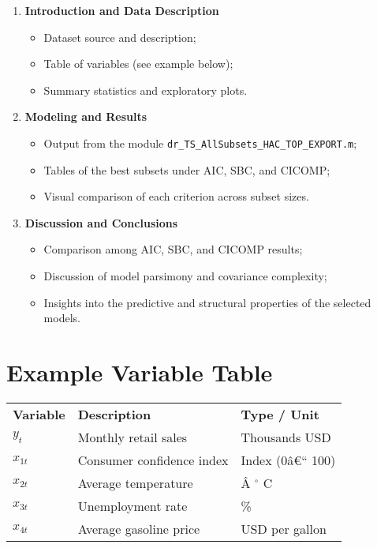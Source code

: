 \documentclass[12pt,thmsa]{article}
\begin{document}
\begin{enumerate}
\item \textbf{Introduction and Data Description}

\begin{itemize}
\item Dataset source and description;

\item Table of variables (see example below);

\item Summary statistics and exploratory plots.
\end{itemize}

\item \textbf{Modeling and Results}

\begin{itemize}
\item Output from the module \texttt{dr\_TS\_AllSubsets\_HAC\_TOP\_EXPORT.m};

\item Tables of the best subsets under AIC, SBC, and CICOMP;

\item Visual comparison of each criterion across subset sizes.
\end{itemize}

\item \textbf{Discussion and Conclusions}

\begin{itemize}
\item Comparison among AIC, SBC, and CICOMP results;

\item Discussion of model parsimony and covariance complexity;

\item Insights into the predictive and structural properties of the selected
models.
\end{itemize}
\end{enumerate}

\section*{Example Variable Table}

\vspace{1pt}

\begin{tabular}{lll}
\textbf{Variable} & \textbf{Description} & \textbf{Type / Unit} \\ 
$y_{t}$ & Monthly retail sales & Thousands USD \\ 
$x_{1t}$ & Consumer confidence index & Index (0\^{a}\euro \textquotedblleft
100) \\ 
$x_{2t}$ & Average temperature & \^{A}%
${{}^\circ}$%
C \\ 
$x_{3t}$ & Unemployment rate & \% \\ 
$x_{4t}$ & Average gasoline price & USD per gallon%
\end{tabular}
\end{document}
